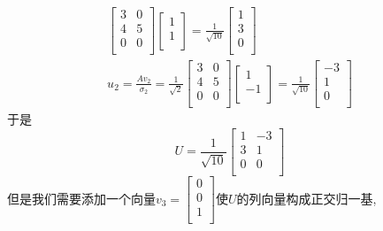 \begin{example}
\begin{equation}
\begin{aligned}
\begin{bmatrix}
            3 & 0\\
            4 & 5\\
            0 & 0\\
           \end{bmatrix}
           \begin{bmatrix}
            1\\
            1\\
           \end{bmatrix}
           =
           \frac{1}{\sqrt{10}}
           \begin{bmatrix}
            1\\
            3\\
            0\\
           \end{bmatrix}
           \\
           u_2 = \frac{Av_2}{\sigma_2} = \frac{1}{\sqrt{2}} \begin{bmatrix}
            3 & 0\\
            4 & 5\\
            0 & 0\\
           \end{bmatrix}
           \begin{bmatrix}
              1\\
              -1\\
           \end{bmatrix}
             =
             \frac{1}{\sqrt{10}}
           \begin{bmatrix}
              -3\\
              1\\
              0\\
           \end{bmatrix}
      \end{aligned}
    \end{equation}
    于是
    \begin{equation}
      U = \frac{1}{\sqrt{10}}
      \begin{bmatrix}
       1 & -3\\
       3 & 1\\
       0 & 0\\
      \end{bmatrix}
    \end{equation}
    但是我们需要添加一个向量$v_3 = \begin{bmatrix}
     0\\
     0\\
     1\\
    \end{bmatrix}$使$U$的列向量构成正交归一基,
\end{example}

